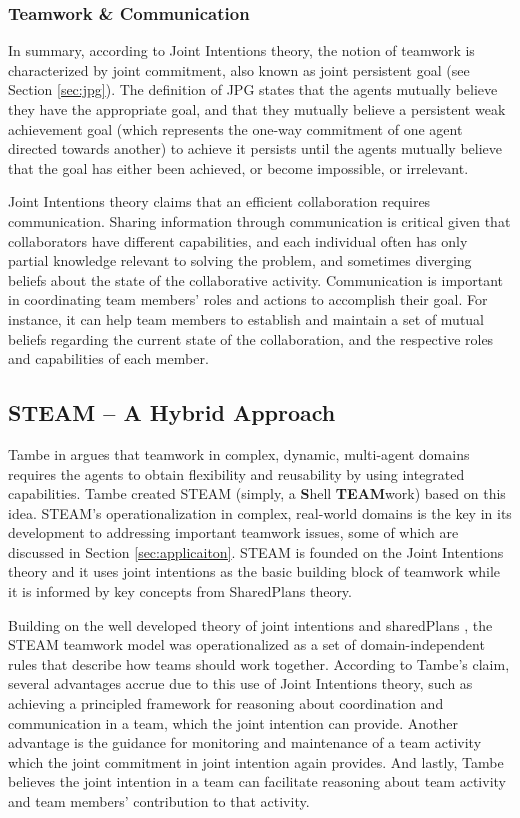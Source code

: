 \documentclass[12pt]{report}
\begin{document}
\subsubsection{Teamwork \& Communication}

In summary, according to Joint Intentions theory, the notion of teamwork is
characterized by joint commitment, also known as joint persistent goal (see
Section \ref{sec:jpg}). The definition of JPG states that the agents mutually
believe they have the appropriate goal, and that they mutually believe a
persistent weak achievement goal (which represents the one-way commitment of one
agent directed towards another) to achieve it persists until the agents mutually
believe that the goal has either been achieved, or become impossible, or
irrelevant.

Joint Intentions theory claims that an efficient collaboration requires
communication. Sharing information through communication is critical given that
collaborators have different capabilities, and each individual often has only
partial knowledge relevant to solving the problem, and sometimes diverging
beliefs about the state of the collaborative activity. Communication is
important in coordinating team members' roles and actions to accomplish their
goal. For instance, it can help team members to establish and maintain a set of
mutual beliefs regarding the current state of the collaboration, and the
respective roles and capabilities of each member.

\subsection{STEAM -- A Hybrid Approach}

Tambe in \cite{tambe:flexible-teamwork} argues that teamwork in complex,
dynamic, multi-agent domains requires the agents to obtain flexibility and
reusability by using integrated capabilities. Tambe created STEAM (simply, a
\textbf{S}hell \textbf{TEAM}work) based on this idea. STEAM's operationalization
in complex, real-world domains is the key in its development to addressing 
important teamwork issues, some of which are discussed in Section
\ref{sec:applicaiton}. STEAM is founded on the Joint Intentions theory and it
uses joint intentions as the basic building block of teamwork while it is
informed by key concepts from SharedPlans theory.

Building on the well developed theory of joint intentions \cite{cohen:teamwork}
and sharedPlans \cite{grosz:collaboration, grosz:plans-discourse}, the STEAM
teamwork model \cite{tambe:flexible-teamwork} was operationalized as a set of
domain-independent rules that describe how teams should work together. According
to Tambe's claim, several advantages accrue due to this use of Joint Intentions
theory, such as achieving a principled framework for reasoning about
coordination and communication in a team, which the joint intention can provide.
Another advantage is the guidance for monitoring and maintenance of a team
activity which the joint commitment in joint intention again provides. And
lastly, Tambe believes the joint intention in a team can facilitate reasoning
about team activity and team members' contribution to that activity.
\end{document}

